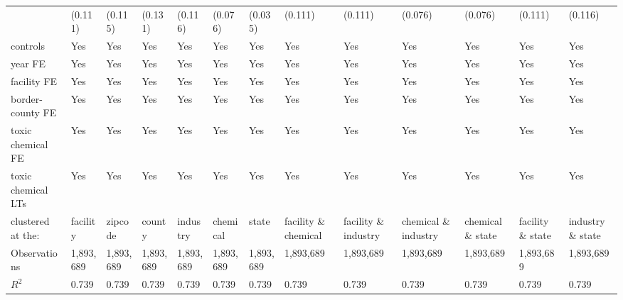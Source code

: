 \begin{table}[H]
{\begin{tabular}{@{}lllllllllllll@{}}
            & (0.111)   & (0.115)   & (0.131)   & (0.116)   & (0.076)   & (0.035)   & (0.111)              & (0.111)              & (0.076)              & (0.076)          & (0.111)          & (0.116)          \\
            controls                            & Yes       & Yes       & Yes       & Yes       & Yes       & Yes       & Yes                  & Yes                  & Yes                  & Yes               & Yes               & Yes               \\
            year FE                             & Yes       & Yes       & Yes       & Yes       & Yes       & Yes       & Yes                  & Yes                  & Yes                  & Yes               & Yes               & Yes               \\
            facility FE                         & Yes       & Yes       & Yes       & Yes       & Yes       & Yes       & Yes                  & Yes                  & Yes                  & Yes               & Yes               & Yes               \\
            border-county FE                    & Yes       & Yes       & Yes       & Yes       & Yes       & Yes       & Yes                  & Yes                  & Yes                  & Yes               & Yes               & Yes               \\
            toxic chemical FE                   & Yes       & Yes       & Yes       & Yes       & Yes       & Yes       & Yes                  & Yes                  & Yes                  & Yes               & Yes               & Yes               \\
            toxic chemical LTs                  & Yes       & Yes       & Yes       & Yes       & Yes       & Yes       & Yes                  & Yes                  & Yes                  & Yes               & Yes               & Yes               \\\midrule
            clustered at the:                   & facility  & zipcode   & county    & industry  & chemical  & state     & facility \& chemical & facility \& industry & chemical \& industry & chemical \& state & facility \& state & industry \& state \\
            Observations                        & 1,893,689 & 1,893,689 & 1,893,689 & 1,893,689 & 1,893,689 & 1,893,689 & 1,893,689            & 1,893,689            & 1,893,689            & 1,893,689         & 1,893,689         & 1,893,689         \\
            $R^2$                               & 0.739     & 0.739     & 0.739     & 0.739     & 0.739     & 0.739     & 0.739                & 0.739                & 0.739                & 0.739             & 0.739             & 0.739             \\ \bottomrule\bottomrule

\end{tabular}}
\end{table}

